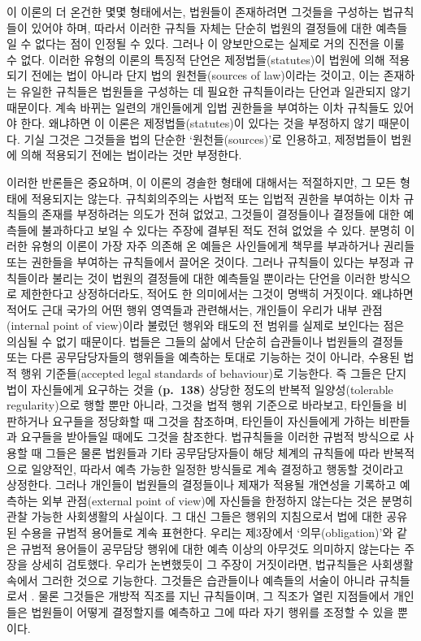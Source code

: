 이 이론의 더 온건한 몇몇 형태에서는, 법원들이 존재하려면 그것들을
구성하는 법규칙들이 있어야 하며, 따라서 이러한 규칙들 자체는 단순히
법원의 결정들에 대한 예측들일 수 없다는 점이 인정될 수 있다. 그러나 이
양보만으로는 실제로 거의 진전을 이룰 수 없다. 이러한 유형의 이론의
특징적 단언은 제정법들(statutes)이 법원에 의해 적용되기 전에는 법이
아니라 단지 법의 원천들(sources of law)이라는 것이고, 이는 존재하는
유일한 규칙들은 법원들을 구성하는 데 필요한 규칙들이라는 단언과 일관되지
않기 때문이다. 계속 바뀌는 일련의 개인들에게 입법 권한들을 부여하는 이차
규칙들도 있어야 한다. 왜냐하면 이 이론은 제정법들(statutes)이 있다는
것을 부정하지 않기 때문이다. 기실 그것은 그것들을 법의 단순한
‘원천들(sources)’로 인용하고, 제정법들이 법원에 의해 적용되기 전에는
법이라는 것만 부정한다.

이러한 반론들은 중요하며, 이 이론의 경솔한 형태에 대해서는 적절하지만,
그 모든 형태에 적용되지는 않는다. 규칙회의주의는 사법적 또는 입법적
권한을 부여하는 이차 규칙들의 존재를 부정하려는 의도가 전혀 없었고,
그것들이 결정들이나 결정들에 대한 예측들에 불과하다고 보일 수 있다는
주장에 결부된 적도 전혀 없었을 수 있다. 분명히 이러한 유형의 이론이 가장
자주 의존해 온 예들은 사인들에게 책무를 부과하거나 권리들 또는 권한들을
부여하는 규칙들에서 끌어온 것이다. 그러나 규칙들이 있다는 부정과
규칙들이라 불리는 것이 법원의 결정들에 대한 예측들일 뿐이라는 단언을
이러한 방식으로 제한한다고 상정하더라도, 적어도 한 의미에서는 그것이
명백히 거짓이다. 왜냐하면 적어도 근대 국가의 어떤 행위 영역들과
관련해서는, 개인들이 우리가 내부 관점(internal point of view)이라 불렀던
행위와 태도의 전 범위를 실제로 보인다는 점은 의심될 수 없기 때문이다.
법들은 그들의 삶에서 단순히 습관들이나 법원들의 결정들 또는 다른
공무담당자들의 행위들을 예측하는 토대로 기능하는 것이 아니라, 수용된
법적 행위 기준들(accepted legal standards of behaviour)로 기능한다. 즉
그들은 단지 법이 자신들에게 요구하는 것을 \textbf{(p.~138)} 상당한
정도의 반복적 일양성(tolerable regularity)으로 행할 뿐만 아니라, 그것을
법적 행위 기준으로 바라보고, 타인들을 비판하거나 요구들을 정당화할 때
그것을 참조하며, 타인들이 자신들에게 가하는 비판들과 요구들을 받아들일
때에도 그것을 참조한다. 법규칙들을 이러한 규범적 방식으로 사용할 때
그들은 물론 법원들과 기타 공무담당자들이 해당 체계의 규칙들에 따라
반복적으로 일양적인, 따라서 예측 가능한 일정한 방식들로 계속 결정하고
행동할 것이라고 상정한다. 그러나 개인들이 법원들의 결정들이나 제재가
적용될 개연성을 기록하고 예측하는 외부 관점(external point of view)에
자신들을 한정하지 않는다는 것은 분명히 관찰 가능한 사회생활의 사실이다.
그 대신 그들은 행위의 지침으로서 법에 대한 공유된 수용을 규범적 용어들로
계속 표현한다. 우리는 제3장에서 ‘의무(obligation)’와 같은 규범적
용어들이 공무담당 행위에 대한 예측 이상의 아무것도 의미하지 않는다는
주장을 상세히 검토했다. 우리가 논변했듯이 그 주장이 거짓이라면,
법규칙들은 사회생활 속에서 그러한 것으로 기능한다. 그것들은 습관들이나
예측들의 서술이 아니라 규칙들로서 . 물론 그것들은
개방적 직조를 지닌 규칙들이며, 그 직조가 열린 지점들에서 개인들은
법원들이 어떻게 결정할지를 예측하고 그에 따라 자기 행위를 조정할 수 있을
뿐이다.

